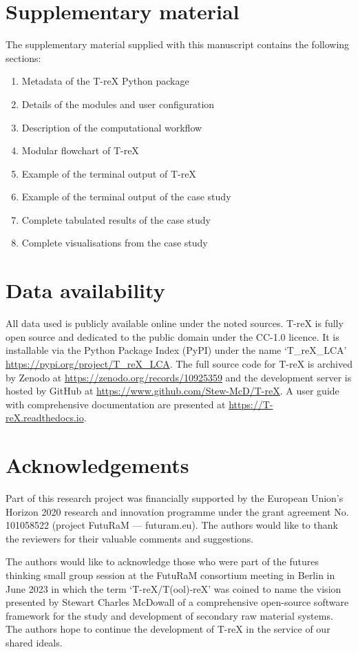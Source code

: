 \documentclass[a4paper,fleqn]{cas-dc}
\begin{document}
\section{Supplementary material}\label{sec:supplementary}
The supplementary material supplied with this manuscript contains the
following sections:
\begin{enumerate}
	\item Metadata of the T-reX Python package
	\item Details of the modules and user configuration
	\item Description of the computational workflow
	\item Modular flowchart of T-reX
	\item Example of the terminal output of T-reX
	\item Example of the terminal output of the case study
	\item Complete tabulated results of the case study
	\item Complete visualisations from the case study
\end{enumerate}

\section*{Data availability}
All data used is publicly available online under the noted sources. T-reX is fully open source and dedicated to the public domain under the CC-1.0 licence. It is installable via the Python Package Index (PyPI) under the name `T\_reX\_LCA' \url{https://pypi.org/project/T_reX_LCA}.
The full source code for T-reX is archived by Zenodo at \url{https://zenodo.org/records/10925359} 
and the development server is hosted by GitHub at \url{https://www.github.com/Stew-McD/T-reX}. A user guide with comprehensive documentation are presented at \url{https://T-reX.readthedocs.io}.

\section*{Acknowledgements}
Part of this research project was financially supported by the European Union's Horizon 2020 research and innovation programme under the grant agreement No. 101058522 (project FutuRaM --- futuram.eu). The authors would like to thank the reviewers for their valuable comments and suggestions.

The authors would like to acknowledge those who were part of the futures
thinking small group session at the FutuRaM consortium meeting in Berlin in
June 2023 in which the term `T-reX/T(ool)-reX' was coined to name the vision
presented by Stewart Charles McDowall of a comprehensive open-source software
framework for the study and development of secondary raw material systems. The
authors hope to continue the development of T-reX in the service of our shared
ideals.
\end{document}
